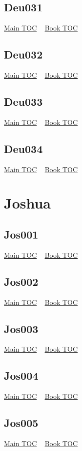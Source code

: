 \documentclass{book}
\begin{document}
  \section{Deu031}\hyperlink{toc}{Main TOC} ~ \hyperref[subsec:Deu]{Book TOC} 
  \section{Deu032}\hyperlink{toc}{Main TOC} ~ \hyperref[subsec:Deu]{Book TOC} 
  \section{Deu033}\hyperlink{toc}{Main TOC} ~ \hyperref[subsec:Deu]{Book TOC} 
  \section{Deu034}\hyperlink{toc}{Main TOC} ~ \hyperref[subsec:Deu]{Book TOC} 
  \chapter{Joshua} \label{subsec:Jos} \begin{multicols}{2} \minitoc \end{multicols}
  \section{Jos001}\hyperlink{toc}{Main TOC} ~ \hyperref[subsec:Jos]{Book TOC} 
  \section{Jos002}\hyperlink{toc}{Main TOC} ~ \hyperref[subsec:Jos]{Book TOC} 
  \section{Jos003}\hyperlink{toc}{Main TOC} ~ \hyperref[subsec:Jos]{Book TOC} 
  \section{Jos004}\hyperlink{toc}{Main TOC} ~ \hyperref[subsec:Jos]{Book TOC} 
  \section{Jos005}\hyperlink{toc}{Main TOC} ~ \hyperref[subsec:Jos]{Book TOC} 
\end{document}
